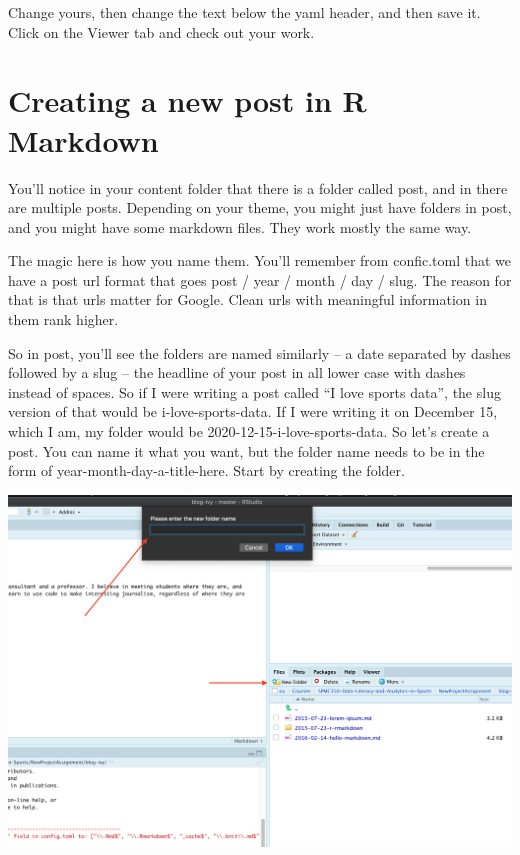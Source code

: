 \documentclass[
]{book}
\begin{document}
Change yours, then change the text below the yaml header, and then save it. Click on the Viewer tab and check out your work.

\hypertarget{creating-a-new-post-in-r-markdown}{%
\section{Creating a new post in R Markdown}\label{creating-a-new-post-in-r-markdown}}

You'll notice in your content folder that there is a folder called post, and in there are multiple posts. Depending on your theme, you might just have folders in post, and you might have some markdown files. They work mostly the same way.

The magic here is how you name them. You'll remember from confic.toml that we have a post url format that goes post / year / month / day / slug. The reason for that is that urls matter for Google. Clean urls with meaningful information in them rank higher.

So in post, you'll see the folders are named similarly -- a date separated by dashes followed by a slug -- the headline of your post in all lower case with dashes instead of spaces. So if I were writing a post called ``I love sports data'', the slug version of that would be i-love-sports-data. If I were writing it on December 15, which I am, my folder would be 2020-12-15-i-love-sports-data.
So let's create a post. You can name it what you want, but the folder name needs to be in the form of year-month-day-a-title-here. Start by creating the folder.

\includegraphics[width=32.83in]{images/blog6}
\end{document}
